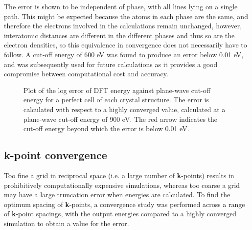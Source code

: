 The error is shown to be independent of phase, with all lines lying on a single path. This might be expected because the atoms in each phase are the same, and therefore the electrons involved in the calculations remain unchanged, however, interatomic distances are different in the different phases and thus so are the electron densities, so this equivalence in convergence does not necessarily have to follow. A cut-off energy of 600 eV was found to produce an error below 0.01 eV, and was subsequently used for future calculations as it provides a good compromise between computational cost and accuracy.

\begin{figure}[ht] %
	\begin{center}
		\caption{Plot of the log error of DFT energy against plane-wave cut-off energy for a perfect cell of each crystal structure. The error is calculated with respect to a highly converged value, calculated at a plane-wave cut-off energy of 900 eV. The red arrow indicates the cut-off energy beyond which the error is below 0.01 eV.}
		\label{Figure:cutoffconvergence}
	\end{center}
\end{figure}

\subsection{\textbf{k}-point convergence}

Too fine a grid in reciprocal space (i.e. a large number of \textbf{k}-points) results in prohibitively computationally expensive simulations, whereas too coarse a grid may have a large truncation error when energies are calculated. To find the optimum spacing of \textbf{k}-points, a convergence study was performed across a range of \textbf{k}-point spacings, with the output energies compared to a highly converged simulation to obtain a value for the error. 

